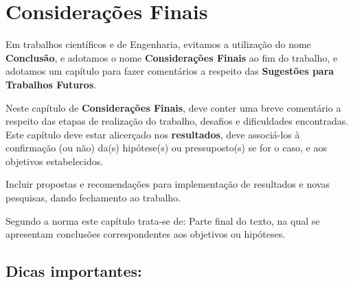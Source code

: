 \chapter{Considerações Finais}

    Em trabalhos científicos e de Engenharia, evitamos a utilização do nome {\bf Conclusão}, e adotamos o nome {\bf Considerações Finais} ao fim do trabalho, e adotamos um capítulo para fazer comentários a respeito das {\bf Sugestões para Trabalhos Futuros}.

    Neste capítulo de {\bf Considerações Finais}, deve conter uma breve comentário a respeito das etapas de realização do trabalho, desafios e dificuldades encontradas.    
    Este capítulo deve estar alicerçado nos {\bf resultados}, deve associá-los à confirmação (ou não) da(s) hipótese(s) ou pressuposto(s) se for o caso, e aos objetivos estabelecidos.

    Incluir propostas e recomendações para implementação de resultados e novas pesquisas, dando fechamento ao trabalho.
    
    Segundo a norma \cite{NBR14724_TrabalhosAcademicos} este capítulo trata-se de: Parte final do texto, na qual se apresentam conclusões correspondentes aos objetivos ou hipóteses. 

\section{Dicas importantes:}
    
